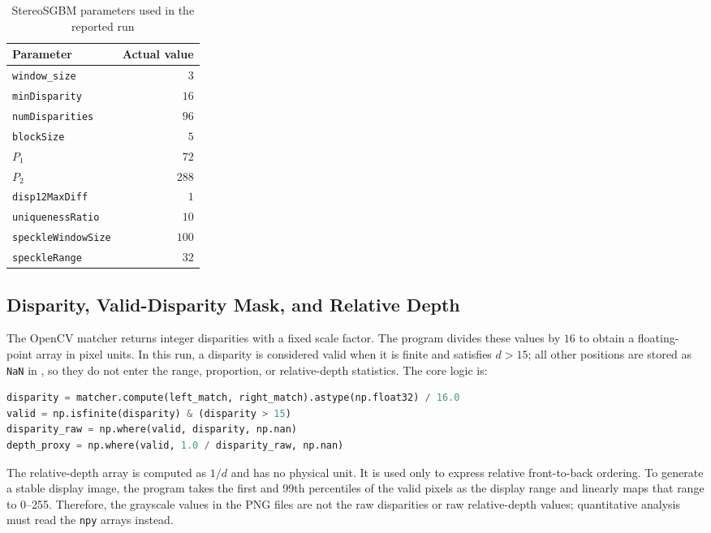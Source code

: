 \begin{table}[H]
  \centering
  \caption{StereoSGBM parameters used in the reported run}
  \label{tab:sgbm-params}
  \begin{tabular}{lr}
    \toprule
    Parameter & Actual value \\
    \midrule
    \texttt{window\_size} & $3$ \\
    \texttt{minDisparity} & $16$ \\
    \texttt{numDisparities} & $96$ \\
    \texttt{blockSize} & $5$ \\
    $P_1$ & $72$ \\
    $P_2$ & $288$ \\
    \texttt{disp12MaxDiff} & $1$ \\
    \texttt{uniquenessRatio} & $10$ \\
    \texttt{speckleWindowSize} & $100$ \\
    \texttt{speckleRange} & $32$ \\
    \bottomrule
  \end{tabular}
\end{table}

\subsection{Disparity, Valid-Disparity Mask, and Relative Depth}

The OpenCV matcher returns integer disparities with a fixed scale factor. The program divides
these values by $16$ to obtain a floating-point array in pixel units. In this run, a disparity is
considered valid when it is finite and satisfies $d>15$; all other positions are stored as
\texttt{NaN} in , so they do not enter the range, proportion, or
relative-depth statistics. The core logic is:

\begin{lstlisting}[language=Python]
disparity = matcher.compute(left_match, right_match).astype(np.float32) / 16.0
valid = np.isfinite(disparity) & (disparity > 15)
disparity_raw = np.where(valid, disparity, np.nan)
depth_proxy = np.where(valid, 1.0 / disparity_raw, np.nan)
\end{lstlisting}

The relative-depth array is computed as $1/d$ and has no physical unit. It is used only to express
relative front-to-back ordering. To generate a stable display image, the program takes the first
and 99th percentiles of the valid pixels as the display range and linearly maps that range to
0--255. Therefore, the grayscale values in the PNG files are not the raw disparities or raw
relative-depth values; quantitative analysis must read the \texttt{npy} arrays instead.

